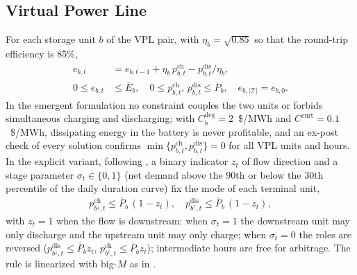 \documentclass[conference]{IEEEtran}
\begin{document}
\subsection{Virtual Power Line}
For each storage unit $b$ of the VPL pair, with $\eta_b = \sqrt{0.85}$ so that the round-trip efficiency is 85\%,
\begin{align}
e_{b,t} &= e_{b,t-1} + \eta_b\, p^{\mathrm{ch}}_{b,t} - p^{\mathrm{dis}}_{b,t}/\eta_b, \label{eq:soc}\\
0 \le e_{b,t} &\le \overline{E}_b, \quad 0 \le p^{\mathrm{ch}}_{b,t},\, p^{\mathrm{dis}}_{b,t} \le \overline{P}_b, \quad e_{b,|\mathcal{T}|} = e_{b,0}. \label{eq:soccycle}
\end{align}
In the emergent formulation no constraint couples the two units or forbids simultaneous charging and discharging; with $C^{\mathrm{deg}}_b = 2$~\$/MWh and $C^{\mathrm{curt}} = 0.1$~\$/MWh, dissipating energy in the battery is never profitable, and an ex-post check of every solution confirms $\min\{p^{\mathrm{ch}}_{b,t}, p^{\mathrm{dis}}_{b,t}\} = 0$ for all VPL units and hours. In the explicit variant, following \cite{ferreira2026}, a binary indicator $z_t$ of flow direction and a stage parameter $\sigma_t\in\{0,1\}$ (net demand above the 90th or below the 30th percentile of the daily duration curve) fix the mode of each terminal unit,
\begin{align}
p^{\mathrm{ch}}_{b^{\downarrow},t} \le \overline{P}_b\,(1 - z_{t}), \quad p^{\mathrm{dis}}_{b^{\uparrow},t} \le \overline{P}_b\,(1 - z_{t}), \label{eq:vtl_explicit}
\end{align}
with $z_t = 1$ when the flow is downstream: when $\sigma_t=1$ the downstream unit may only discharge and the upstream unit may only charge; when $\sigma_t=0$ the roles are reversed ($p^{\mathrm{dis}}_{b^{\downarrow},t} \le \overline{P}_b z_t$, $p^{\mathrm{ch}}_{b^{\uparrow},t} \le \overline{P}_b z_t$); intermediate hours are free for arbitrage. The rule is linearized with big-$M$ as in \cite{ferreira2026}.
\end{document}
